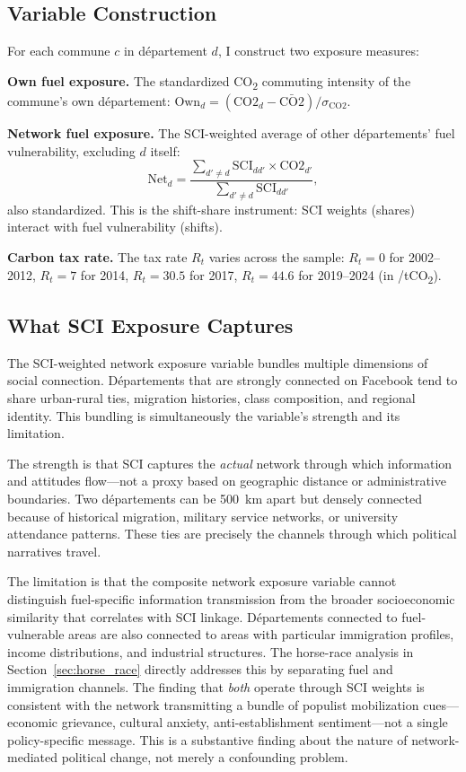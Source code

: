 \documentclass[12pt]{article}
\providecommand{\euro}{\texteuro}
\newcommand{\dept}{d\'{e}partement}
\newcommand{\depts}{d\'{e}partements}
\begin{document}
\subsection{Variable Construction}

For each commune $c$ in \dept{} $d$, I construct two exposure measures:

\textbf{Own fuel exposure.} The standardized CO\textsubscript{2} commuting intensity of the commune's own \dept{}: $\text{Own}_d = (\text{CO2}_d - \bar{\text{CO2}}) / \sigma_{\text{CO2}}$.

\textbf{Network fuel exposure.} The SCI-weighted average of other \depts{}' fuel vulnerability, excluding $d$ itself:
\begin{equation}
\text{Net}_d = \frac{\sum_{d' \neq d} \text{SCI}_{dd'} \times \text{CO2}_{d'}}{\sum_{d' \neq d} \text{SCI}_{dd'}},
\label{eq:network_exposure}
\end{equation}
also standardized. This is the shift-share instrument: SCI weights (shares) interact with fuel vulnerability (shifts).

\textbf{Carbon tax rate.} The tax rate $R_t$ varies across the sample: $R_t = 0$ for 2002--2012, $R_t = 7$ for 2014, $R_t = 30.5$ for 2017, $R_t = 44.6$ for 2019--2024 (in \euro/tCO\textsubscript{2}).

\subsection{What SCI Exposure Captures}
\label{sec:sci_captures}

The SCI-weighted network exposure variable bundles multiple dimensions of social connection. D\'{e}partements that are strongly connected on Facebook tend to share urban-rural ties, migration histories, class composition, and regional identity. This bundling is simultaneously the variable's strength and its limitation.

The strength is that SCI captures the \emph{actual} network through which information and attitudes flow---not a proxy based on geographic distance or administrative boundaries. Two \depts{} can be 500~km apart but densely connected because of historical migration, military service networks, or university attendance patterns. These ties are precisely the channels through which political narratives travel.

The limitation is that the composite network exposure variable cannot distinguish fuel-specific information transmission from the broader socioeconomic similarity that correlates with SCI linkage. D\'{e}partements connected to fuel-vulnerable areas are also connected to areas with particular immigration profiles, income distributions, and industrial structures. The horse-race analysis in Section~\ref{sec:horse_race} directly addresses this by separating fuel and immigration channels. The finding that \emph{both} operate through SCI weights is consistent with the network transmitting a bundle of populist mobilization cues---economic grievance, cultural anxiety, anti-establishment sentiment---not a single policy-specific message. This is a substantive finding about the nature of network-mediated political change, not merely a confounding problem.
\end{document}

